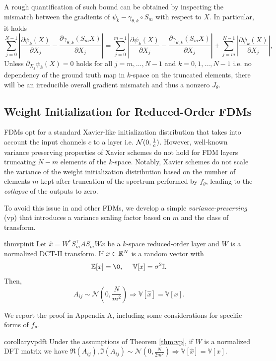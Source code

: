 A rough quantification of such bound can be obtained by inspecting the mismatch between the gradients of $\psi_k - \gamma_{\theta,k}\circ S_m$ with respect to $X$. In particular, it holds 
%
\[
    \sum_{j=0}^{N-1}\left|\frac{\partial\psi_k(X)}{\partial X_j} - \frac{\partial\gamma_{\theta,k}(S_m X)}{\partial X_j}\right| = \sum_{j=0}^{m-1}\left|\frac{\partial\psi_k(X)}{\partial X_j} - \frac{\partial\gamma_{\theta,k}(S_mX)}{\partial X_j}\right| + \sum_{j=m}^{N-1}\left|\frac{\partial\psi_k(X)}{\partial X_j}\right|,
\]
%
Unless $\partial_{X_j}\psi_k(X) = 0$ holds for all $j = m, \dots, N-1$ and $k = 0, 1, \dots, N-1$ i.e. no dependency of the ground truth map in $k$-space on the truncated elements, there will be an irreducible overall gradient mismatch and thus a nonzero $J_\theta$.


\subsection{Weight Initialization for Reduced-Order FDMs}\label{subsec:init}
%

FDMs \citep{li2020fourier,tran2021factorized,wen2022u} opt for a standard Xavier-like \citep{glorot2010understanding} initialization distribution that takes into account the input channels $c$ to a layer i.e. $\mathcal{N}(0, \frac{1}{c})$. However, well-known variance preserving properties of Xavier schemes do not hold for FDM layers truncating $N - m$ elements of the $k$-space. Notably, Xavier schemes do not scale the variance of the weight initialization distribution based on the number of elements $m$ kept after truncation of the spectrum performed by $f_\theta$, leading to the \textit{collapse} of the outputs to zero. 


To avoid this issue in \ourmethod{} and other FDMs, we develop a simple \textit{variance-preserving} (vp) that introduces a variance scaling factor based on $m$ and the class of transform. 


{
\begin{restatable}{thm}{vpinit}\label{thm:vp}
%
Let $\hat x = W^* S_m^\top A S_m W x$ be a $k$-space reduced-order layer and $W$ is a normalized DCT-II transform. If $x\in\mathbb{R}^N$ is a random vector with 
%
\[
    \bE[x] = \0, \quad~ \mathbb{V}[x] = \sigma^2 \Id.
\]
%
Then,
%
\[
   A_{ij} \sim \mathcal{N}\left(0, \frac{{N}}{m^2}\right) \Rightarrow \mathbb{V}[\hat x] = \mathbb{V}[x].
\]
%
\end{restatable}
}


We report the proof in Appendix A, including some considerations for specific forms of $f_\theta$.
%
{
\begin{restatable}{corollary}{vpdft}\label{cor:vp_dft}
    Under the assumptions of Theorem \ref{thm:vp}, if $W$ is a normalized DFT matrix we have $\Re(A_{ij}),\Im(A_{ij}) \sim \mathcal{N}(0, \frac{N}{2m^2}) \Rightarrow \mathbb{V}[\hat x] = \mathbb{V}[x]$.
\end{restatable}
}
%

